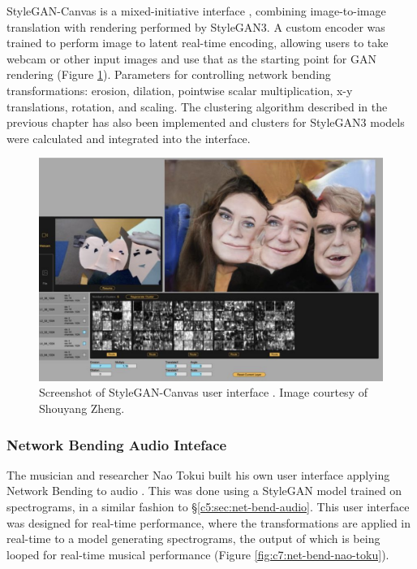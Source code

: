 StyleGAN-Canvas is a mixed-initiative interface \citep{zheng2023stylegan}, combining image-to-image translation with rendering performed by StyleGAN3. 
A custom encoder was trained to perform image to latent real-time encoding, allowing users to take webcam or other input images and use that as the starting point for GAN rendering (Figure \ref{fig:c7:stylegan-canvas}). 
Parameters for controlling network bending transformations: erosion, dilation, pointwise scalar multiplication, x-y translations, rotation, and scaling.
The clustering algorithm described in the previous chapter has also been implemented and clusters for StyleGAN3 models were calculated and integrated into the interface.

\begin{figure}[!htb]
    \centering
    \captionsetup{justification=centering}
    \includegraphics[width=1\textwidth]{figures/c7_impact/net-bend-technical/stylegan-canvas.png}
    \caption[StyleGAN-Canvas user interface]{Screenshot of StyleGAN-Canvas user interface \citep{zheng2023stylegan}. Image courtesy of Shouyang Zheng.}
    \label{fig:c7:stylegan-canvas}
\end{figure}

\subsubsection{Network Bending Audio Inteface}
\label{c7:subsubsec:naotokui}

The musician and researcher Nao Tokui built his own user interface applying Network Bending to audio \cite{tokui2023bending}. 
This was done using a StyleGAN model trained on spectrograms, in a similar fashion to \S \ref{c5:sec:net-bend-audio}.
This user interface was designed for real-time performance, where the transformations are applied in real-time to a model generating spectrograms, the output of which is being looped for real-time musical performance (Figure \ref{fig:c7:net-bend-nao-toku}).

